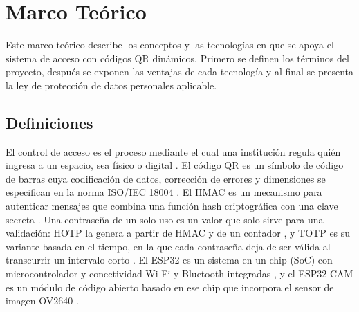 \section{Marco Teórico}
Este marco teórico describe los conceptos y las tecnologías en que se apoya el
sistema de acceso con códigos QR dinámicos. Primero se definen los términos
del proyecto, después se exponen las ventajas de cada tecnología y al final
se presenta la ley de protección de datos personales aplicable.

\subsection{Definiciones}
El control de acceso es el proceso mediante el cual una institución regula
quién ingresa a un espacio, sea físico o digital \parencite{alsawi2026qracs}.
El código QR es un símbolo de código de barras cuya codificación de datos,
corrección de errores y dimensiones se especifican en la norma ISO/IEC 18004
\parencite{isoiec180042015}. El HMAC es un mecanismo para autenticar
mensajes que combina una función hash criptográfica con una clave secreta
\parencite{krawczyk1997hmac}. Una contraseña de un solo uso es un valor que
solo sirve para una validación: HOTP la genera a partir de HMAC y de un
contador \parencite{mraihi2005hotp}, y TOTP es su variante basada en el
tiempo, en la que cada contraseña deja de ser válida al transcurrir un
intervalo corto \parencite{mraihi2011totp}. El ESP32 es un sistema en un chip
(SoC) con microcontrolador y conectividad Wi-Fi y Bluetooth integradas
\parencite{espressif2025esp32}, y el ESP32-CAM es un módulo de código abierto
basado en ese chip que incorpora el sensor de imagen OV2640
\parencite{nowroz2025esp32cam}.

